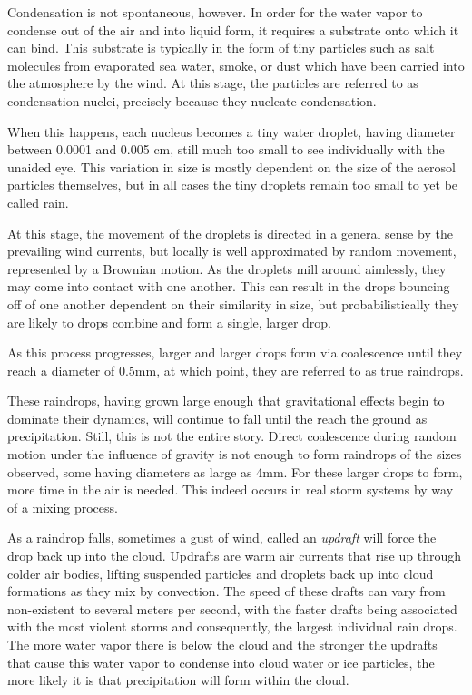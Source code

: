 \documentclass[twocolumn,a4paper,10pt]{article}
\begin{document}
Condensation is not spontaneous, however. In order for the water vapor to
condense out of the air and into liquid form, it requires a substrate onto which
it can bind.  This substrate is typically in the form of tiny particles such as
salt molecules from evaporated sea water, smoke, or dust which have been carried
into the atmosphere by the wind. At this stage, the particles are referred to as
condensation nuclei, precisely because they nucleate condensation.

When this happens, each nucleus becomes a tiny water droplet, having diameter
between 0.0001 and 0.005 cm, still much too small to see individually with the
unaided eye. This variation in size is mostly dependent on the size of the
aerosol particles themselves, but in all cases the tiny droplets remain too
small to yet be called rain.

At this stage, the movement of the droplets is directed in a general sense by
the prevailing wind currents, but locally is well approximated by random
movement, represented by a Brownian motion. As the droplets mill around
aimlessly, they may come into contact with one another. This can result in the
drops bouncing off of one another dependent on their similarity in size, but
probabilistically they are likely to drops combine and form a single, larger
drop.

As this process progresses, larger and larger drops form via coalescence until
they reach a diameter of 0.5mm, at which point, they are referred to as
true raindrops.

These raindrops, having grown large enough that gravitational effects begin to
dominate their dynamics, will continue to fall until the reach the ground as
precipitation. Still, this is not the entire story. Direct coalescence during
random motion under the influence of gravity is not enough to form raindrops of
the sizes observed, some having diameters as large as 4mm. For these larger
drops to form, more time in the air is needed. This indeed occurs in real storm
systems by way of a mixing process.

As a raindrop falls, sometimes a gust of wind, called an \emph{updraft} will
force the drop back up into the cloud.  Updrafts are warm air currents that rise
up through colder air bodies, lifting suspended particles and droplets back up
into cloud formations as they mix by convection. The speed of these drafts can
vary from non-existent to several meters per second, with the faster drafts
being associated with the most violent storms and consequently, the largest
individual rain drops. The more water vapor there is below the cloud and the
stronger the updrafts that cause this water vapor to condense into cloud water
or ice particles, the more likely it is that precipitation will form within the
cloud.
\end{document}
